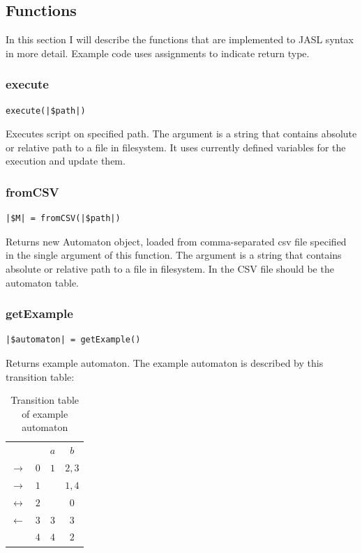 \documentclass{ctuthesis}
\begin{document}
\subsection{Functions}
\label{sec:functions}
In this section I will describe the functions that are implemented to JASL syntax in more detail. Example code uses assignments to indicate return type.

\subsubsection{execute}
\label{subsec:execute}
\begin{lstlisting}[language = JASL_snippet]
	execute(|$path|)
\end{lstlisting}

Executes script on specified path. The argument is a string that contains absolute or relative path to a file in filesystem. It uses currently defined variables for the execution and update them.

\subsubsection{fromCSV}
\begin{lstlisting}[language = JASL_snippet]
	|$M| = fromCSV(|$path|)
\end{lstlisting}

Returns new Automaton object, loaded from comma-separated csv file specified in the single argument of this function. The argument is a string that contains absolute or relative path to a file in filesystem. In the CSV file should be the automaton table.

\subsubsection{getExample}
\begin{lstlisting}[language = JASL_snippet]
	|$automaton| = getExample()
\end{lstlisting}

Returns example automaton. The example automaton is described by this transition table:
\begin{table}[H]
\begin{ctucolortab}
\begin{tabular}{cc|c|c}
	 & & $a$ & $b$ \\\Midrule
	$\rightarrow$ & $0$ & $1$ & $2,3$ \\
	$\rightarrow$ & $1$ & & $1,4$ \\
	$\leftrightarrow$ & $2$ & & $0$ \\
	$\leftarrow$ & $3$ & $3$ & $3$ \\
	 & $4$ & $4$ & $2$ 
\end{tabular}
\end{ctucolortab}
\caption{Transition table of example automaton}
\label{fig:example_automaton_table}
\end{table}
\end{document}
